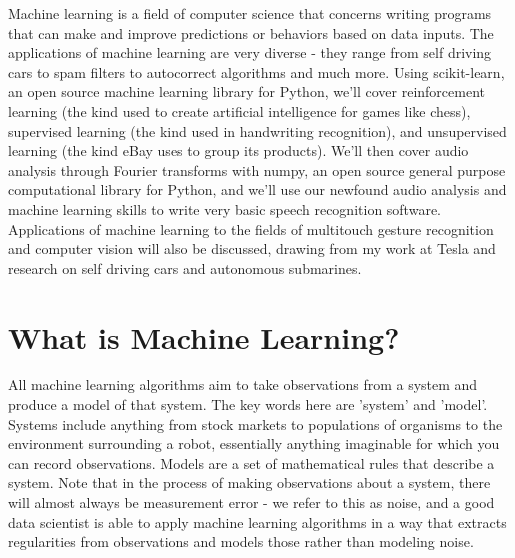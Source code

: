 \documentclass[11pt]{article}
\begin{document}
Machine learning is a field of computer science that concerns writing programs that can make and improve predictions or behaviors based on data inputs. The applications of machine learning are very diverse - they range from self driving cars to spam filters to autocorrect algorithms and much more. Using scikit-learn, an open source machine learning library for Python, we'll cover reinforcement learning (the kind used to create artificial intelligence for games like chess), supervised learning (the kind used in handwriting recognition), and unsupervised learning (the kind eBay uses to group its products). We'll then cover audio analysis through Fourier transforms with numpy, an open source general purpose computational library for Python, and we'll use our newfound audio analysis and machine learning skills to write very basic speech recognition software. Applications of machine learning to the fields of multitouch gesture recognition and computer vision will also be discussed, drawing from my work at Tesla and research on self driving cars and autonomous submarines.


\section{What is Machine Learning?}
All machine learning algorithms aim to take observations from a system and produce a model of that system. The key words here are 'system' and 'model'. Systems include anything from stock markets to populations of organisms to the environment surrounding a robot, essentially anything imaginable for which you can record observations. Models are a set of mathematical rules that describe a system. Note that in the process of making observations about a system, there will almost always be measurement error - we refer to this as noise, and a good data scientist is able to apply machine learning algorithms in a way that extracts regularities from observations and models those rather than modeling noise.
\end{document}

